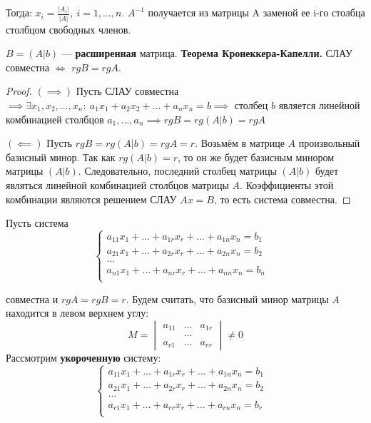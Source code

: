 Тогда: $x_i = \frac{|A_i|}{|A|},~i=1,\dots,n$. $A^{-1}$ получается из матрицы A заменой ее i-го столбца столбцом свободных членов.

$B = (A|b)$ --- \textbf{расширенная} матрица.
\newline
\textbf{Теорема Кронеккера-Капелли.} СЛАУ совместна $\iff$ $rgB = rgA$.

    \begin{proof}
    $(\implies)$ Пусть СЛАУ совместна $\implies \exists x_1, x_2, \dots, x_n:~a_1x_1 + a_2x_2 + \dots + a_nx_n = b \implies$ столбец $b$ является линейной комбинацией столбцов $a_1,\dots,a_n \implies rgB=rg(A|b) = rgA$
    
    $(\impliedby)$ Пусть $rgB = rg(A|b) = rgA = r$. Возьмём в матрице $A$ произвольный базисный минор. Так как $rg(A|b) = r$, то он же будет базисным минором матрицы $(A|b)$. Следовательно, последний столбец матрицы $(A|b)$ будет являться линейной комбинацией столбцов матрицы $A$. Коэффициенты этой комбинации являются решением СЛАУ $Ax=B$, то есть система совместна.
    \end{proof}

Пусть система
$$\begin{cases}
        a_{11}x_1+\dots + a_{1r}x_r+\dots+a_{1n}x_n = b_1&\\
        a_{21}x_1+\dots + a_{2r}x_r+\dots+a_{2n}x_n = b_2&\\
        \dots&\\
        a_{n1}x_1+\dots + a_{nr}x_r+\dots+a_{nn}x_n = b_n&\\
    \end{cases}$$

совместна и $rgA = rgB = r$. Будем считать, что базисный минор матрицы $A$ находится в левом верхнем углу:
$$M = \begin{vmatrix}
          a_{11} & \dots & a_{1r}\\
          & \dots & \\
          a_{r1} & \dots & a_{rr}
    \end{vmatrix} \neq 0 $$
Рассмотрим \textbf{укороченную} систему:
\begin{equation}
    \begin{cases}
        a_{11}x_1+\dots + a_{1r}x_r+\dots+a_{1n}x_n = b_1&\\
        a_{21}x_1+\dots + a_{2r}x_r+\dots+a_{2n}x_n = b_2&\\
        \dots&\\
        a_{r1}x_1+\dots + a_{rr}x_r+\dots+a_{rn}x_n = b_r&\\
    \end{cases}
    \label{eq1}
\end{equation}

